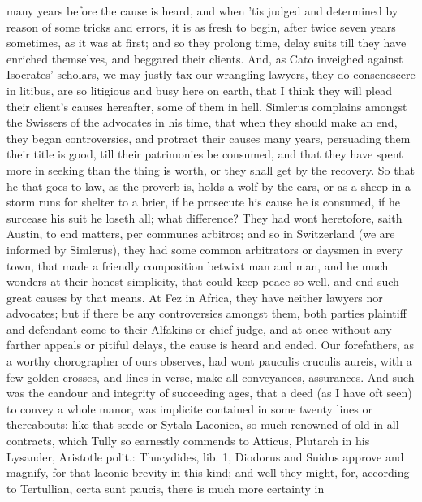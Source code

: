 {many years before the cause is heard, and when 'tis judged and
determined by reason of some tricks and errors, it is as fresh to
begin, after twice seven years sometimes, as it was at first; and so
they prolong time, delay suits till they have enriched themselves, and
beggared their clients. And, as Cato inveighed against Isocrates'
scholars, we may justly tax our wrangling lawyers, they do consenescere
in litibus, are so litigious and busy here on earth, that I think they
will plead their client's causes hereafter, some of them in hell. 
Simlerus complains amongst the Swissers of the advocates in his time,
that when they should make an end, they began controversies, and
protract their causes many years, persuading them their title is good,
till their patrimonies be consumed, and that they have spent more in
seeking than the thing is worth, or they shall get by the recovery. So
that he that goes to law, as the proverb is, holds a wolf by the
ears, or as a sheep in a storm runs for shelter to a brier, if he
prosecute his cause he is consumed, if he surcease his suit he loseth
all; what difference? They had wont heretofore, saith Austin, to
end matters, per communes arbitros; and so in Switzerland (we are
informed by Simlerus), they had some common arbitrators or daysmen
in every town, that made a friendly composition betwixt man and man,
and he much wonders at their honest simplicity, that could keep peace
so well, and end such great causes by that means. At Fez in
Africa, they have neither lawyers nor advocates; but if there be any
controversies amongst them, both parties plaintiff and defendant come
to their Alfakins or chief judge, and at once without any farther
appeals or pitiful delays, the cause is heard and ended. Our
forefathers, as a worthy chorographer of ours observes, had wont
pauculis cruculis aureis, with a few golden crosses, and lines in
verse, make all conveyances, assurances. And such was the candour and
integrity of succeeding ages, that a deed (as I have oft seen) to
convey a whole manor, was implicite contained in some twenty lines or
thereabouts; like that scede or Sytala Laconica, so much renowned of
old in all contracts, which Tully so earnestly commends to
Atticus, Plutarch in his Lysander, Aristotle polit.: Thucydides, lib.
1, Diodorus and Suidus approve and magnify, for that laconic
brevity in this kind; and well they might, for, according to
Tertullian, certa sunt paucis, there is much more certainty in
}
